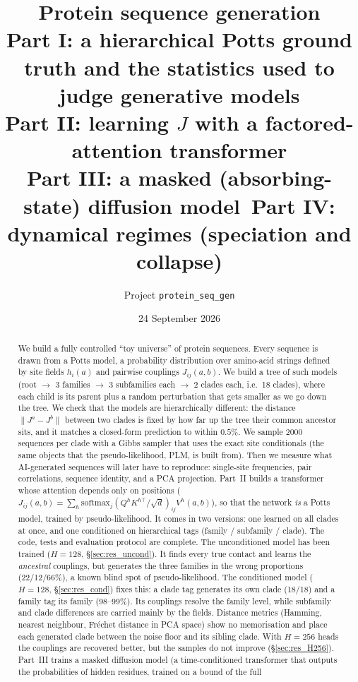 \documentclass[11pt,a4paper]{article}
\title{\textbf{Protein sequence generation}\\[4pt]
\large Part I: a hierarchical Potts ground truth and the statistics used to judge generative models\\
Part II: learning $J$ with a factored-attention transformer\\
Part III: a masked (absorbing-state) diffusion model\
Part IV: dynamical regimes (speciation and collapse)}
\author{Project \texttt{protein\_seq\_gen}}
\date{24 September 2026}
\begin{document}
\maketitle

\begin{abstract}
We build a fully controlled ``toy universe'' of protein sequences. Every sequence is drawn from a
Potts model, a probability distribution over amino-acid strings defined by site fields $h_i(a)$ and
pairwise couplings $J_{ij}(a,b)$. We build a tree of such models (root $\to$ 3 families $\to$ 3
subfamilies each $\to$ 2 clades each, i.e.\ 18 clades), where each child is its parent plus a random
perturbation that gets smaller as we go down the tree. We check that the models are hierarchically
different: the distance $\|J^a-J^b\|$ between two clades is fixed by how far up the tree their common
ancestor sits, and it matches a closed-form prediction to within $0.5\%$. We sample 2000 sequences per
clade with a Gibbs sampler that uses the exact site conditionals (the same objects that the
pseudo-likelihood, PLM, is built from). Then we measure what AI-generated sequences will later have
to reproduce: single-site frequencies, pair correlations, sequence identity, and a PCA projection.
Part~II builds a transformer whose attention depends only on positions
($J_{ij}(a,b)=\sum_h\mathrm{softmax}_j(Q^hK^{h\top}/\sqrt d)_{ij}V^h(a,b)$), so that the network \emph{is} a Potts
model, trained by pseudo-likelihood. It comes in two versions: one learned on all clades at once, and one
conditioned on hierarchical tags (family / subfamily / clade). The code, tests and evaluation protocol are
complete. The unconditioned model has been trained ($H=128$, \S\ref{sec:res_uncond}). It finds every true contact
and learns the \emph{ancestral} couplings, but generates the three families in the wrong proportions
(22/12/66\%), a known blind spot of pseudo-likelihood. The conditioned model ($H=128$,
\S\ref{sec:res_cond}) fixes this: a clade tag generates its own clade (18/18) and a family tag its family
(98--99\%). Its couplings resolve the family level, while subfamily and clade differences are carried mainly
by the fields. Distance metrics (Hamming, nearest neighbour, Fréchet distance in PCA space) show no memorisation
and place each generated clade between the noise floor and its sibling clade. With $H=256$ heads the couplings
are recovered better, but the samples do not improve (\S\ref{sec:res_H256}). Part~III trains a masked diffusion model
(a time-conditioned transformer that outputs the probabilities of hidden residues, trained on a bound of the full

\end{abstract}
\end{document}
